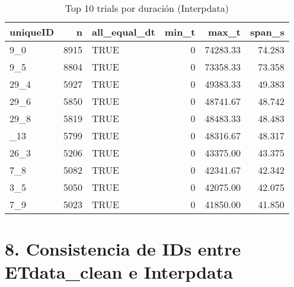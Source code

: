 \documentclass[
]{article}
\newenvironment{Shaded}{\begin{snugshade}}{\end{snugshade}}
\newcommand{\AttributeTok}[1]{\textcolor[rgb]{0.13,0.29,0.53}{#1}}
\newcommand{\ConstantTok}[1]{\textcolor[rgb]{0.56,0.35,0.01}{#1}}
\newcommand{\FunctionTok}[1]{\textcolor[rgb]{0.13,0.29,0.53}{\textbf{#1}}}
\newcommand{\NormalTok}[1]{#1}
\newcommand{\OtherTok}[1]{\textcolor[rgb]{0.56,0.35,0.01}{#1}}
\newcommand{\SpecialCharTok}[1]{\textcolor[rgb]{0.81,0.36,0.00}{\textbf{#1}}}
\begin{document}
\begin{longtable}[t]{lrlrrr}
\caption{\label{tab:unnamed-chunk-9}Top 10 trials por duración (Interpdata)}\\
\toprule
uniqueID & n & all\_equal\_dt & min\_t & max\_t & span\_s\\
\midrule
9\_0 & 8915 & TRUE & 0 & 74283.33 & 74.283\\
9\_5 & 8804 & TRUE & 0 & 73358.33 & 73.358\\
29\_4 & 5927 & TRUE & 0 & 49383.33 & 49.383\\
29\_6 & 5850 & TRUE & 0 & 48741.67 & 48.742\\
29\_8 & 5819 & TRUE & 0 & 48483.33 & 48.483\\
\addlinespace
9\_13 & 5799 & TRUE & 0 & 48316.67 & 48.317\\
26\_3 & 5206 & TRUE & 0 & 43375.00 & 43.375\\
7\_8 & 5082 & TRUE & 0 & 42341.67 & 42.342\\
3\_5 & 5050 & TRUE & 0 & 42075.00 & 42.075\\
7\_9 & 5023 & TRUE & 0 & 41850.00 & 41.850\\
\bottomrule
\end{longtable}

\section{8. Consistencia de IDs entre ETdata\_clean e
Interpdata}\label{consistencia-de-ids-entre-etdata_clean-e-interpdata}

\begin{Shaded}
\end{Shaded}
\end{document}
